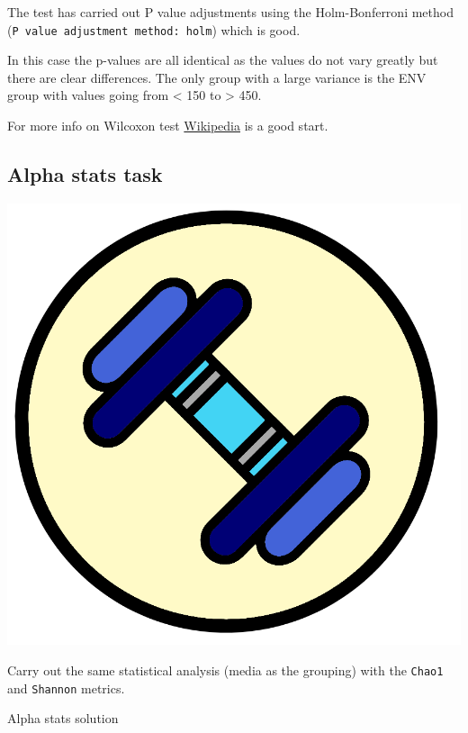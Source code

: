 \documentclass[
]{book}
\newenvironment{Shaded}{\begin{snugshade}}{\end{snugshade}}
\newcommand{\CommentTok}[1]{\textcolor[rgb]{0.56,0.35,0.01}{\textit{#1}}}
\newcommand{\FunctionTok}[1]{\textcolor[rgb]{0.13,0.29,0.53}{\textbf{#1}}}
\newcommand{\NormalTok}[1]{#1}
\newcommand{\SpecialCharTok}[1]{\textcolor[rgb]{0.81,0.36,0.00}{\textbf{#1}}}
\begin{document}
The test has carried out P value adjustments using the Holm-Bonferroni method (\texttt{P\ value\ adjustment\ method:\ holm}) which is good.

In this case the p-values are all identical as the values do not vary greatly but there are clear differences.
The only group with a large variance is the ENV group with values going from \textless{} 150 to \textgreater{} 450.

For more info on Wilcoxon test \href{https://en.wikipedia.org/wiki/Wilcoxon_signed-rank_test}{Wikipedia} is a good start.

\hypertarget{alpha-stats-task}{%
\subsection{Alpha stats task}\label{alpha-stats-task}}

\includegraphics{figures/exercises.png}

Carry out the same statistical analysis (media as the grouping) with the \texttt{Chao1} and \texttt{Shannon} metrics.

Alpha stats solution

\begin{Shaded}
\end{Shaded}
\end{document}
